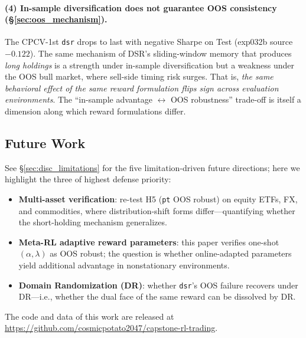 \documentclass[11pt, a4paper]{article}
\begin{document}
\paragraph{(4) In-sample diversification does not guarantee OOS consistency
(\S\ref{sec:oos_mechanism}).}
The CPCV-1st \texttt{dsr} drops to last with negative Sharpe on Test
(exp032b source $-0.122$). The same mechanism of DSR's sliding-window memory
that produces \emph{long holdings} is a strength under in-sample
diversification but a weakness under the OOS bull market, where sell-side
timing risk surges. That is, \emph{the same behavioral effect of the same
reward formulation flips sign across evaluation environments}. The
``in-sample advantage $\leftrightarrow$ OOS robustness'' trade-off is itself
a dimension along which reward formulations differ.

\subsection*{Future Work}

See \S\ref{sec:disc_limitations} for the five limitation-driven future
directions; here we highlight the three of highest defense priority:
\begin{itemize}[leftmargin=*]
\item \textbf{Multi-asset verification}: re-test H5 (\texttt{pt} OOS
robust) on equity ETFs, FX, and commodities, where distribution-shift
forms differ---quantifying whether the short-holding mechanism generalizes.
\item \textbf{Meta-RL adaptive reward parameters}: this paper verifies
one-shot $(\alpha, \lambda)$ as OOS robust; the question is whether
online-adapted parameters yield additional advantage in nonstationary
environments.
\item \textbf{Domain Randomization (DR)}: whether \texttt{dsr}'s OOS
failure recovers under DR---i.e., whether the dual face of the same reward
can be dissolved by DR.
\end{itemize}

The code and data of this work are released at
\url{https://github.com/cosmicpotato2047/capstone-rl-trading}.



\end{document}
